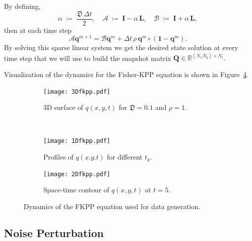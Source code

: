 By defining,
$$\alpha \;\coloneqq\;\frac{\mathfrak{D}\,\Delta t}{2}, \quad \bm{\mathcal{A}} \;\coloneqq\; \mathbf{I} - \alpha\,\mathbf{L}, \quad \bm{\mathcal{B}} \;\coloneqq\; \mathbf{I} + \alpha\,\mathbf{L},$$
then at each time step\\
$$\bm{\mathcal{A}}\mathbf{q}^{m+1} = \bm{\mathcal{B}}\mathbf{q}^m + \Delta t\,\rho\,\mathbf{q}^m\circ(\mathbf{1} - \mathbf{q}^m).$$
By solving this sparse linear system we get the desired state solution at every time step that we will use to build the snapshot matrix
$\mathbf{Q}\in\mathbb R^{(N_xN_y)\times N_t}.$

Visualization of the dynamics for the Fisher-KPP equation is shown in Figure~\ref{fig:fisher-data}.

\begin{figure}[h!]
    \hspace{-0.8cm}
  \centering
  \begin{subfigure}[t]{\textwidth}
    \centering
    \texttt{[image: 3Dfkpp.pdf]}
    \caption{3D surface of $q(x,y,t)$ for $\mathfrak{D}=0.1$ and $\rho=1$.}
    \label{fig:fisher-init}
  \end{subfigure}
  \\[1em]
  \begin{subfigure}[t]{0.48\textwidth}
    \centering
    \texttt{[image: 1Dfkpp.pdf]}
    \caption{Profiles of $q(x.y.t)$ for different $t_k$.}
    \label{fig:fisher-mid}
  \end{subfigure}
  \hfill
  \begin{subfigure}[t]{0.48\textwidth}
    \centering
    \texttt{[image: 2Dfkpp.pdf]}
    \caption{Space-time contour of $q(x,y,t)$ at $t=5$.}
    \label{fig:fisher-final}
  \end{subfigure}
  \caption{Dynamics of the FKPP equation used for data generation.}
  \label{fig:fisher-data}
\end{figure}     

\newpage


\subsection*{Noise Perturbation}

\vspace{1.0cm}

